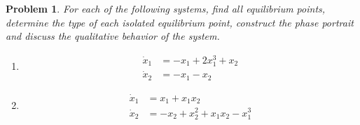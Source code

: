 \documentclass[12pt]{exam}
\theoremstyle{mytheoremstyle}
\newtheorem{problem}{Problem}
\begin{document}
\newpage
\begin{problem}
For each of the following systems, find all equilibrium points, determine the type of each
isolated equilibrium point, construct the phase portrait and discuss the qualitative behavior of the system.
\begin{enumerate}[label=(P\arabic*)]
    \item 
    \begin{align*}
        \dot{x}_1 &= -x_1 + 2 x_1^3 + x_2 \\
        \dot{x}_2 &= -x_1 - x_2
    \end{align*}
    \item 
    \begin{align*}
        \dot{x}_1 &= x_1 + x_1 x_2 \\
        \dot{x}_2 &= -x_2 + x_2^2 + x_1 x_2 - x_1^3
    \end{align*}
\end{enumerate}
\end{problem}
\end{document}
